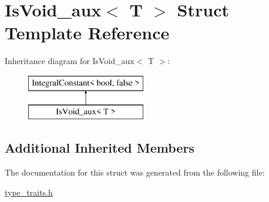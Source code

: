 \hypertarget{struct_is_void__aux}{}\section{Is\+Void\+\_\+aux$<$ T $>$ Struct Template Reference}
\label{struct_is_void__aux}
Inheritance diagram for Is\+Void\+\_\+aux$<$ T $>$\+:\begin{figure}[H]
\begin{center}
\leavevmode
\includegraphics[height=2.000000cm]{struct_is_void__aux}
\end{center}
\end{figure}
\subsection*{Additional Inherited Members}


The documentation for this struct was generated from the following file\+:\begin{DoxyCompactItemize}
\item 
\hyperlink{type__traits_8h}{type\+\_\+traits.\+h}\end{DoxyCompactItemize}
